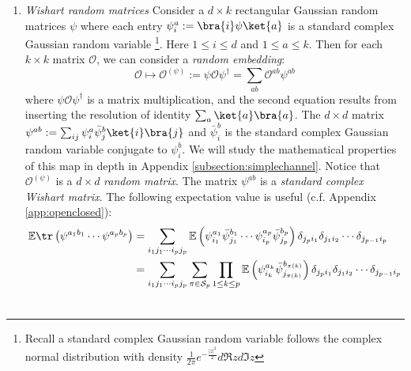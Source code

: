 \documentclass[a4paper,11pt]{article}
\theoremstyle{definition}
\numberwithin{equation}{section}
\newcommand{\lb}{\left(}
\newcommand{\rb}{\right)}
\begin{document}
\begin{enumerate}
\begin{align}
        \begin{split}
            \bra{W(\rho_\beta^{1/2})}\lambda(e_{i_1j_1})\cdots\lambda(e_{i_pj_p})\ket{W(\rho_\beta^{1/2})}_\text{conn} &= \sum_j \frac{e^{-\beta E_j}}{Z}\delta_{ji_1}\delta_{j_1i_2}\cdots\delta_{j_{p-1}i_p}\delta_{j_pj}
        \end{split}
    \end{align}
    This is a quintessential example of Poissonization of matrix algebra.
    \item \textit{Wishart random matrices} Consider a $d\times k$ rectangular Gaussian random matrices $\psi$ where each entry $\psi_i^a := \bra{i}\psi\ket{a}$ is a standard complex Gaussian random variable \footnote{Recall a standard complex Gaussian random variable follows the complex normal distribution with density $\frac{1}{2\pi}e^{-\frac{|z|^2}{2}}d\Re{z}d\Im{z}$}. Here $1\leq i\leq d$ and $1\leq a\leq k$. Then for each $k\times k$ matrix $\mathcal{O}$, we can consider a \textit{random embedding}:
    \begin{equation}
        \mathcal{O}\mapsto\mathcal{O}^{(\psi)} := \psi\mathcal{O}\psi^\dagger = \sum_{ab}\mathcal{O}^{ab}\psi^{ab}
    \end{equation}
    where $\psi\mathcal{O}\psi^\dagger $ is a matrix multiplication, and the second equation results from inserting the resolution of identity $\sum_a\ket{a}\bra{a}$. The $d\times d$ matrix $\psi^{ab} := \sum_{ij}\psi^a_i\bar{\psi}^b_j\ket{i}\bra{j}$ and $\bar{\psi}^b_i$ is the standard complex Gaussian random variable conjugate to $\psi^b_i$. We will study the mathematical properties of this map in depth in Appendix \ref{subsection:simplechannel}. Notice that $\mathcal{O}^{(\psi)}$ is a $d\times d$ \textit{random matrix}. The matrix $\psi^{ab}$ is a \textit{standard complex Wishart matrix}. The following expectation value is useful (c.f. Appendix \ref{app:openclosed}):
    \begin{align}
        \begin{split}
            \mathbb{E}\tr\lb \psi^{a_1b_1}\cdots\psi^{a_pb_p} \rb &= \sum_{i_1j_1\cdots i_pj_p} \mathbb{E}\lb\psi^{a_1}_{i_1}\bar{\psi}^{b_1}_{j_1}\cdots\psi^{a_p}_{i_p}\bar{\psi}^{b_p}_{j_p}\rb\delta_{j_pi_1}\delta_{j_1i_2}\cdots\delta_{j_{p-1}i_p}
            \\& = \sum_{i_1j_1\cdots i_pj_p}\sum_{\pi\in\mathcal{S}_p}\prod_{1\leq k\leq p}\mathbb{E}\lb\psi^{a_k}_{i_k}\bar{\psi}^{b_{\pi(k)}}_{j_{\pi(k)}}\rb\delta_{j_pi_1}\delta_{j_1i_2}\cdots\delta_{j_{p-1}i_p}
            \\&

\end{split}
\end{align}
\end{enumerate}
\end{document}
